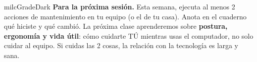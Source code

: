 \documentclass[11pt,letterpaper]{article}
\begin{document}
\begin{infoband}{milcGradeDark}
\textbf{Para la próxima sesión.} Esta semana, ejecuta al menos 2 acciones de mantenimiento en tu equipo (o el de tu casa). Anota en el cuaderno qué hiciste y qué cambió. La próxima clase aprenderemos sobre \textbf{postura, ergonomía y vida útil}: cómo cuidarte TÚ mientras usas el computador, no solo cuidar al equipo. Si cuidas las 2 cosas, la relación con la tecnología es larga y sana.
\end{infoband}
\end{document}
